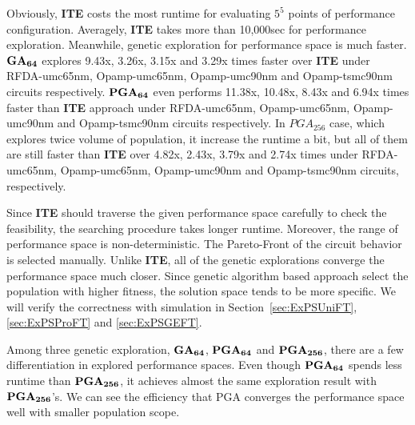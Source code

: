       Obviously, {\bf ITE} costs the most runtime for evaluating $5^5$ points of performance configuration. Averagely, {\bf ITE} takes more than 10,000sec for performance exploration. Meanwhile, genetic exploration for performance space is much faster. {$\bf GA_{64}$} explores 9.43x, 3.26x, 3.15x and 3.29x times faster over {\bf ITE} under RFDA-umc65nm, Opamp-umc65nm, Opamp-umc90nm and Opamp-tsmc90nm circuits respectively. {$\bf PGA_{64}$} even performs 11.38x, 10.48x, 8.43x and 6.94x times faster than {\bf ITE} approach under RFDA-umc65nm, Opamp-umc65nm, Opamp-umc90nm and Opamp-tsmc90nm circuits respectively. In {\bf $PGA_{256}$} case, which explores twice volume of population, it increase the runtime a bit, but all of them are still faster than {\bf ITE} over 4.82x, 2.43x, 3.79x and 2.74x times under RFDA-umc65nm, Opamp-umc65nm, Opamp-umc90nm and Opamp-tsmc90nm circuits, respectively. 

      Since {\bf ITE} should traverse the given performance space carefully to check the feasibility, the searching procedure takes longer runtime. Moreover, the range of performance space is non-deterministic. The Pareto-Front of the circuit behavior is selected manually. Unlike {\bf ITE}, all of the genetic explorations converge the performance space much closer. Since genetic algorithm based approach select the population with higher fitness, the solution space tends to be more specific. We will verify the correctness with simulation in Section~\ref{sec:ExPSUniFT}, \ref{sec:ExPSProFT} and \ref{sec:ExPSGEFT}.
      
      Among three genetic exploration, {$\bf GA_{64}$}, {$\bf PGA_{64}$} and {$\bf PGA_{256}$}, there are a few differentiation in explored performance spaces. Even though {$\bf PGA_{64}$} spends less runtime than {$\bf PGA_{256}$}, it achieves almost the same exploration result with {$\bf PGA_{256}$}'s. We can see the efficiency that PGA converges the performance space well with smaller population scope. 

      
